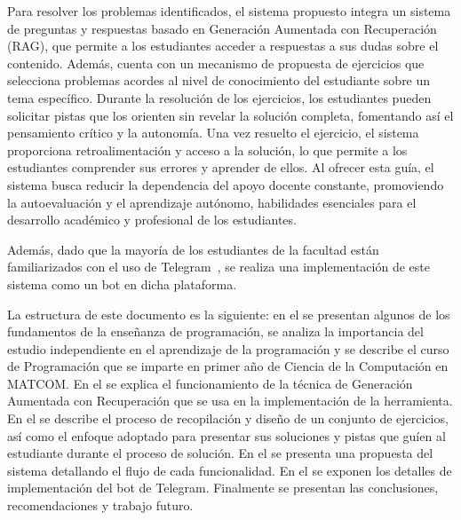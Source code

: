 Para resolver los problemas identificados, el sistema propuesto integra un sistema de preguntas y respuestas basado en Generación Aumentada con Recuperación (RAG), que permite a los estudiantes acceder a respuestas a sus dudas sobre el contenido. Además, cuenta con un mecanismo de propuesta de ejercicios que selecciona problemas acordes al nivel de conocimiento del estudiante sobre un tema específico. Durante la resolución de los ejercicios, los estudiantes pueden solicitar pistas que los orienten sin revelar la solución completa, fomentando así el pensamiento crítico y la autonomía. Una vez resuelto el ejercicio, el sistema proporciona retroalimentación y acceso a la solución, lo que permite a los estudiantes comprender sus errores y aprender de ellos. Al ofrecer esta guía, el sistema busca reducir la dependencia del apoyo docente constante, promoviendo la autoevaluación y el aprendizaje autónomo, habilidades esenciales para el desarrollo académico y profesional de los estudiantes.

Además, dado que la mayoría de los estudiantes de la facultad están familiarizados con el uso de Telegram~\cite{Telegram}, se realiza una implementación de este sistema como un bot en dicha plataforma.

La estructura de este documento es la siguiente: en el  se presentan algunos de los fundamentos de la enseñanza de programación, se analiza la importancia del estudio independiente en el aprendizaje de la programación y se describe el curso de Programación que se imparte en primer año de Ciencia de la Computación en \mbox{MATCOM}. En el  se explica el funcionamiento de la técnica de Generación Aumentada con Recuperación que se usa en la implementación de la herramienta. En el  se describe el proceso de recopilación y diseño de un conjunto de ejercicios, así como el enfoque adoptado para presentar sus soluciones y pistas que guíen al estudiante durante el proceso de solución. En el  se presenta una propuesta del sistema detallando el flujo de cada funcionalidad. En el  se exponen los detalles de implementación del bot de Telegram. Finalmente se presentan las conclusiones, recomendaciones y trabajo futuro.